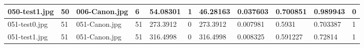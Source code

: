 \begin{landscape}
\begin{longtable}{|p{2cm}|p{1cm}|p{2cm}|p{1cm}|p{2cm}|p{1cm}|p{2cm}|p{2cm}|p{2cm}|p{2cm}|p{1cm}|}
		050-test1.jpg   & 50               & 006-Canon.jpg         & 6                           & 54.08301              & 1                       & 46.28163                   & 0.037603              & 0.700851              & 0.989943                 & 0                \\ \hline
		051-test0.jpg   & 51               & 051-Canon.jpg         & 51                          & 273.3912              & 0                       & 273.3912                   & 0.007981              & 0.5931                & 0.703387                 & 1                \\ \hline
		051-test1.jpg   & 51               & 051-Canon.jpg         & 51                          & 316.4998              & 0                       & 316.4998                   & 0.008325              & 0.591227              & 0.72814                  & 1                \\ \hline
	\end{longtable}
\end{landscape}

